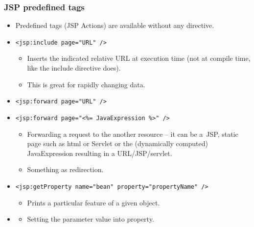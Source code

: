 \documentclass[10pt,xcolor=pdflatex]{beamer}
\begin{document}
\begin{frame}[containsverbatim]\frametitle{JSP predefined tags}
	\begin{itemize}
        \item Predefined tags (JSP Actions) are available without any directive.
    	\item \verb;<jsp:include page="URL" />;
		  \begin{itemize}
			\item Inserts the indicated relative URL at execution time (not at compile time, like the include directive does).
			\item This is great for rapidly changing data.
		  \end{itemize}
        \item \verb;<jsp:forward page="URL" />;
        \item[] \verb;<jsp:forward page="<%= JavaExpression %>" />;
		  \begin{itemize}
            \item Forwarding a request to the another resource -- it can be a~JSP, static page such as html or Servlet or the (dynamically computed) JavaExpression resulting in a URL/JSP/servlet.
            \item Something as redirection.
		  \end{itemize}
        \item \begin{footnotesize}\verb;<jsp:getProperty name="bean" property="propertyName" />;\end{footnotesize}
          \begin{itemize}
        	\item Prints a particular feature of a given object.
           \end{itemize}
        \item \begin{footnotesize}\end{footnotesize}
        \vspace{-0.35cm}
          \begin{itemize}
        	\item Setting the parameter value into property.
          \end{itemize}
    \end{itemize}
\end{frame}
\end{document}
